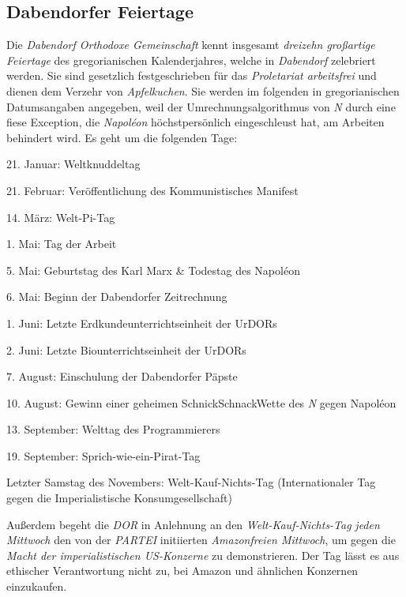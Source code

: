 \subsection{{Dabendorfer Feiertage}}
Die \textit{Dabendorf Orthodoxe Gemeinschaft} kennt insgesamt \textit{dreizehn großartige Feiertage} des gregorianischen Kalenderjahres, welche in \textit{Dabendorf} zelebriert werden. Sie sind gesetzlich festgeschrieben für das \textit{Proletariat arbeitsfrei} und dienen dem Verzehr von \textit{Apfelkuchen}. Sie werden im folgenden in gregorianischen Datumsangaben angegeben, weil der Umrechnungsalgorithmus von \textit{N} durch eine fiese Exception, die \textit{Napoléon} höchstpersönlich eingeschleust hat, am Arbeiten behindert wird. Es geht um die folgenden Tage:
\begin{itemize}
\begin{spacing}{0.5}
\item 21. Januar: Weltknuddeltag
\item 21. Februar: Veröffentlichung des Kommunistisches Manifest
\item 14. März: Welt-Pi-Tag
\item 1. Mai: Tag der Arbeit
\item 5. Mai: Geburtstag des Karl Marx \& Todestag des Napoléon
\item 6. Mai: Beginn der Dabendorfer Zeitrechnung
\item 1. Juni: Letzte Erdkundeunterrichtseinheit der UrDORs
\item 2. Juni: Letzte Biounterrichtseinheit der UrDORs
\item 7. August: Einschulung der Dabendorfer Päpste
\item 10. August: Gewinn einer geheimen SchnickSchnackWette des \textit{N} gegen Napoléon
\item 13. September: Welttag des Programmierers
\item 19. September: Sprich-wie-ein-Pirat-Tag
\item Letzter Samstag des Novembers: Welt-Kauf-Nichts-Tag (Internationaler Tag gegen die Imperialistische Konsumgesellschaft)
\end{spacing}
\end{itemize}

\noindent Außerdem begeht die \textit{DOR} in Anlehnung an den \textit{Welt-Kauf-Nichts-Tag} \textit{jeden Mittwoch} den von der \textit{PARTEI} initiierten \textit{Amazonfreien Mittwoch}, um gegen die \textit{Macht der imperialistischen US-Konzerne} zu demonstrieren. Der Tag lässt es aus ethischer Verantwortung nicht zu, bei Amazon und ähnlichen Konzernen einzukaufen. 

